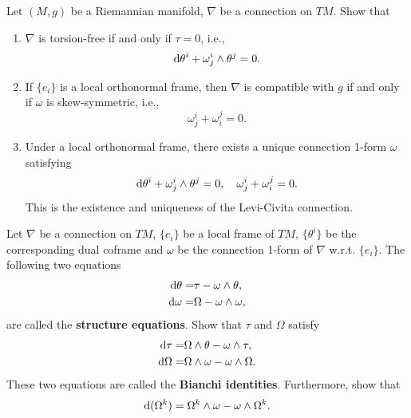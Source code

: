 \begin{exercise}
    Let $(M,g)$ be a Riemannian manifold, $\nabla$ be a connection on $TM$. Show that 
    \begin{enumerate}
        \item $\nabla$ is torsion-free if and only if $\tau=0$, i.e., 
        \begin{equation*}
            {\rm d}\theta^i + \omega_j^i \wedge \theta^j = 0.
        \end{equation*}
        \item If $\{e_i\}$ is a local orthonormal frame, 
        then $\nabla$ is compatible with $g$ if and only if $\omega$ is skew-symmetric, i.e.,
        \begin{equation*}
            \omega_j^i + \omega_i^j = 0.
        \end{equation*}
        \item Under a local orthonormal frame, there exists a unique connection 1-form $\omega$ satisfying 
        \begin{equation*}
            {\rm d}\theta^i + \omega_j^i \wedge \theta^j = 0, \quad
            \omega_j^i + \omega_i^j = 0.
        \end{equation*}
        This is the existence and uniqueness of the Levi-Civita connection.
    \end{enumerate} 
\end{exercise}

\begin{exercise}
    Let $\nabla$ be a connection on $TM$, $\{e_i\}$ be a local frame of $TM$, 
    $\{\theta^i\}$ be the corresponding dual coframe 
    and $\omega$ be the connection 1-form of $\nabla$ w.r.t. $\{e_i\}$. 
    The following two equations 
    \begin{align*}
        {\rm d}\theta =& \tau - \omega \wedge \theta, \\
        {\rm d}\omega =& \Omega - \omega \wedge \omega ,
    \end{align*}
    are called the \textbf{structure equations}. Show that $\tau$ and $\Omega$ satisfy
    \begin{align*}
        {\rm d}\tau =& \Omega \wedge \theta - \omega \wedge \tau, \\
        {\rm d}\Omega =& \Omega \wedge \omega - \omega \wedge \Omega.
    \end{align*}
    These two equations are called the \textbf{Bianchi identities}. Furthermore, show that 
    \begin{equation*}
        {\rm d}(\Omega^k) = \Omega^k \wedge \omega - \omega \wedge \Omega^k.
    \end{equation*}
\end{exercise}

